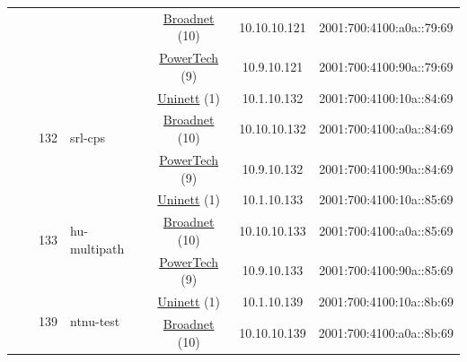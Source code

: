 \begin{small}
\begin{center}
\begin{longtable}{|c|c|c|c|c|c|c|c|}
  &  &  &  & \multicolumn{2}{|c|}{\tiny{\href{https://www.broadnet.no}{Broadnet} (10)}} & \tiny{10.10.10.121} & \tiny{2001:700:4100:a0a::79:69} \\* \cline{5-5}\cline{6-6}\cline{7-7}\cline{8-8}
  &  &  &  & \multicolumn{2}{|c|}{\tiny{\href{http://www.powertech.no}{PowerTech} (9)}} & \tiny{10.9.10.121} & \tiny{2001:700:4100:90a::79:69} \\* \cline{3-3}\cline{4-4}\cline{5-5}\cline{6-6}\cline{7-7}\cline{8-8}
  &  & \multirow{3}{*}{\tiny{132}} & \multicolumn{1}{|l|}{\multirow{3}{*}{\tiny{srl-cps}}} & \multicolumn{2}{|c|}{\tiny{\href{https://www.uninett.no}{Uninett} (1)}} & \tiny{10.1.10.132} & \tiny{2001:700:4100:10a::84:69} \\* \cline{5-5}\cline{6-6}\cline{7-7}\cline{8-8}
  &  &  &  & \multicolumn{2}{|c|}{\tiny{\href{https://www.broadnet.no}{Broadnet} (10)}} & \tiny{10.10.10.132} & \tiny{2001:700:4100:a0a::84:69} \\* \cline{5-5}\cline{6-6}\cline{7-7}\cline{8-8}
  &  &  &  & \multicolumn{2}{|c|}{\tiny{\href{http://www.powertech.no}{PowerTech} (9)}} & \tiny{10.9.10.132} & \tiny{2001:700:4100:90a::84:69} \\* \cline{3-3}\cline{4-4}\cline{5-5}\cline{6-6}\cline{7-7}\cline{8-8}
  &  & \multirow{3}{*}{\tiny{133}} & \multicolumn{1}{|l|}{\multirow{3}{*}{\tiny{hu-multipath}}} & \multicolumn{2}{|c|}{\tiny{\href{https://www.uninett.no}{Uninett} (1)}} & \tiny{10.1.10.133} & \tiny{2001:700:4100:10a::85:69} \\* \cline{5-5}\cline{6-6}\cline{7-7}\cline{8-8}
  &  &  &  & \multicolumn{2}{|c|}{\tiny{\href{https://www.broadnet.no}{Broadnet} (10)}} & \tiny{10.10.10.133} & \tiny{2001:700:4100:a0a::85:69} \\* \cline{5-5}\cline{6-6}\cline{7-7}\cline{8-8}
  &  &  &  & \multicolumn{2}{|c|}{\tiny{\href{http://www.powertech.no}{PowerTech} (9)}} & \tiny{10.9.10.133} & \tiny{2001:700:4100:90a::85:69} \\* \cline{3-3}\cline{4-4}\cline{5-5}\cline{6-6}\cline{7-7}\cline{8-8}
  &  & \multirow{3}{*}{\tiny{139}} & \multicolumn{1}{|l|}{\multirow{3}{*}{\tiny{ntnu-test}}} & \multicolumn{2}{|c|}{\tiny{\href{https://www.uninett.no}{Uninett} (1)}} & \tiny{10.1.10.139} & \tiny{2001:700:4100:10a::8b:69} \\* \cline{5-5}\cline{6-6}\cline{7-7}\cline{8-8}
  &  &  &  & \multicolumn{2}{|c|}{\tiny{\href{https://www.broadnet.no}{Broadnet} (10)}} & \tiny{10.10.10.139} & \tiny{2001:700:4100:a0a::8b:69} \\* \cline{5-5}\cline{6-6}\cline{7-7}\cline{8-8}

\end{longtable}
\end{center}
\end{small}

